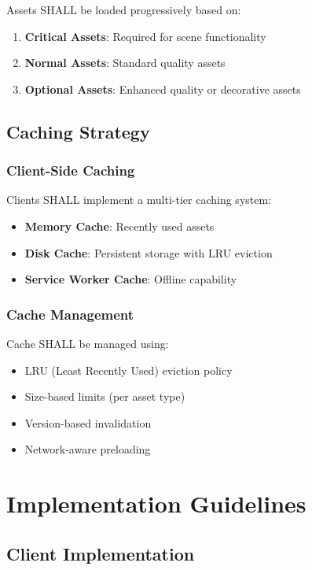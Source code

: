 \documentclass[12pt,a4paper]{article}
\begin{document}
Assets SHALL be loaded progressively based on:

\begin{enumerate}
\item \textbf{Critical Assets}: Required for scene functionality
\item \textbf{Normal Assets}: Standard quality assets
\item \textbf{Optional Assets}: Enhanced quality or decorative assets
\end{enumerate}

\subsection{Caching Strategy}

\subsubsection{Client-Side Caching}

Clients SHALL implement a multi-tier caching system:

\begin{itemize}
\item \textbf{Memory Cache}: Recently used assets
\item \textbf{Disk Cache}: Persistent storage with LRU eviction
\item \textbf{Service Worker Cache}: Offline capability
\end{itemize}

\subsubsection{Cache Management}

Cache SHALL be managed using:

\begin{itemize}
\item LRU (Least Recently Used) eviction policy
\item Size-based limits (per asset type)
\item Version-based invalidation
\item Network-aware preloading
\end{itemize}

\section{Implementation Guidelines}

\subsection{Client Implementation}
\end{document}
